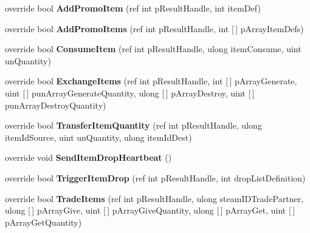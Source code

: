\begin{DoxyCompactItemize}
override bool {\bfseries Add\+Promo\+Item} (ref int p\+Result\+Handle, int item\+Def)
\item 
\mbox{\label{class_valve_1_1_steamworks_1_1_c_steam_inventory_a0090d4b4a9a73bbb135d0feeb960609d}} 
override bool {\bfseries Add\+Promo\+Items} (ref int p\+Result\+Handle, int \mbox{[}$\,$\mbox{]} p\+Array\+Item\+Defs)
\item 
\mbox{\label{class_valve_1_1_steamworks_1_1_c_steam_inventory_a2fa6dc1bd97d5262c9c143659cc1f2a3}} 
override bool {\bfseries Consume\+Item} (ref int p\+Result\+Handle, ulong item\+Consume, uint un\+Quantity)
\item 
\mbox{\label{class_valve_1_1_steamworks_1_1_c_steam_inventory_a5a0aa249fedfd0bd94e005019e78ddab}} 
override bool {\bfseries Exchange\+Items} (ref int p\+Result\+Handle, int \mbox{[}$\,$\mbox{]} p\+Array\+Generate, uint \mbox{[}$\,$\mbox{]} pun\+Array\+Generate\+Quantity, ulong \mbox{[}$\,$\mbox{]} p\+Array\+Destroy, uint \mbox{[}$\,$\mbox{]} pun\+Array\+Destroy\+Quantity)
\item 
\mbox{\label{class_valve_1_1_steamworks_1_1_c_steam_inventory_a045d9ef54470683de0ec490742c63296}} 
override bool {\bfseries Transfer\+Item\+Quantity} (ref int p\+Result\+Handle, ulong item\+Id\+Source, uint un\+Quantity, ulong item\+Id\+Dest)
\item 
\mbox{\label{class_valve_1_1_steamworks_1_1_c_steam_inventory_a8095766c2ec2f5b748b81603c6ccfc7e}} 
override void {\bfseries Send\+Item\+Drop\+Heartbeat} ()
\item 
\mbox{\label{class_valve_1_1_steamworks_1_1_c_steam_inventory_aec41432bde7698173cb0037782a426ff}} 
override bool {\bfseries Trigger\+Item\+Drop} (ref int p\+Result\+Handle, int drop\+List\+Definition)
\item 
\mbox{\label{class_valve_1_1_steamworks_1_1_c_steam_inventory_a8e852cef57392aaf1af6b37fa5f9ec48}} 
override bool {\bfseries Trade\+Items} (ref int p\+Result\+Handle, ulong steam\+I\+D\+Trade\+Partner, ulong \mbox{[}$\,$\mbox{]} p\+Array\+Give, uint \mbox{[}$\,$\mbox{]} p\+Array\+Give\+Quantity, ulong \mbox{[}$\,$\mbox{]} p\+Array\+Get, uint \mbox{[}$\,$\mbox{]} p\+Array\+Get\+Quantity)

\end{DoxyCompactItemize}
